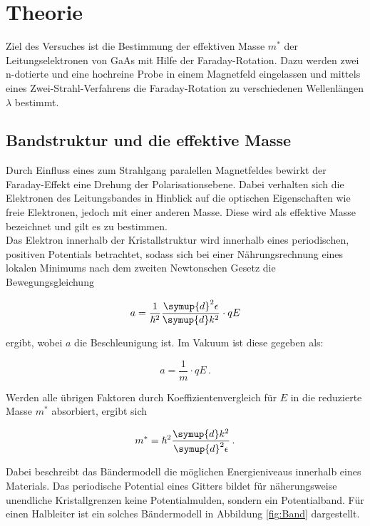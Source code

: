 \section{Theorie}
\label{sec:Theorie}

Ziel des Versuches ist die Bestimmung der effektiven Masse $m^*$ der Leitungselektronen von GaAs mit Hilfe der Faraday-Rotation. Dazu werden 
zwei n-dotierte und eine hochreine Probe in einem Magnetfeld eingelassen und mittels eines Zwei-Strahl-Verfahrens die Faraday-Rotation zu 
verschiedenen Wellenlängen $\lambda$ bestimmt. 

\subsection{Bandstruktur und die effektive Masse}

Durch Einfluss eines zum Strahlgang paralellen Magnetfeldes bewirkt der Faraday-Effekt eine Drehung der Polarisationsebene. Dabei verhalten
sich die Elektronen des Leitungsbandes in Hinblick auf die optischen Eigenschaften wie freie Elektronen, jedoch mit einer anderen Masse. Diese
wird als effektive Masse bezeichnet und gilt es zu bestimmen. \\
Das Elektron innerhalb der Kristallstruktur wird innerhalb eines periodischen, positiven Potentials betrachtet, sodass sich bei einer 
Nährungsrechnung eines lokalen Minimums nach dem zweiten Newtonschen Gesetz die Bewegungsgleichung 

\begin{equation*}
    a = \frac{1}{\hslash^2}\frac{\symup{d}^2\epsilon}{\symup{d}k^2}\cdot qE
\end{equation*}

ergibt, wobei $a$ die Beschleunigung ist. Im Vakuum ist diese gegeben als:

\begin{equation*}
    a = \frac{1}{m}\cdot qE\,.
\end{equation*}

Werden alle übrigen Faktoren durch Koeffizientenvergleich für $E$ in die reduzierte Masse $m^*$ absorbiert, ergibt sich 

\begin{equation*}
    m^* = \hslash^2 \frac{\symup{d}k^2}{\symup{d}^2\epsilon}\,.
\end{equation*}

Dabei beschreibt das Bändermodell die möglichen Energieniveaus innerhalb eines Materials. Das periodische Potential eines Gitters bildet
für näherungsweise unendliche Kristallgrenzen keine Potentialmulden, sondern ein Potentialband. Für einen Halbleiter ist ein solches 
Bändermodell in Abbildung \ref{fig:Band} dargestellt.\\

